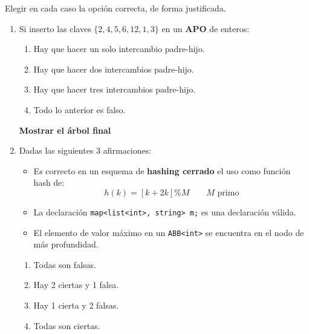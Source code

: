 \documentclass[12pt]{article}
\begin{document}
    \begin{ejercicio}[1 punto] 
        Elegir en cada caso la opción correcta, de forma justificada.
        \begin{enumerate}[label=(\alph*)]
            \item Si inserto las claves $\{2,4,5,6,12,1,3\}$ en un \textbf{APO} de enteros:
                \begin{enumerate}[label=(a\arabic*)]
                    \item Hay que hacer un solo intercambio padre-hijo.
                    \item Hay que hacer dos intercambios padre-hijo.
                    \item Hay que hacer tres intercambios padre-hijo.
                    \item Todo lo anterior es falso.
                \end{enumerate}
                \textbf{Mostrar el árbol final}

            \item Dadas las siguientes 3 afirmaciones:
                \begin{itemize}
                    \item Es correcto en un esquema de \textbf{hashing cerrado} el uso como función hash de:
                        \begin{equation*}
                            h(k) = [k + 2k] \% M \qquad M \text{\ primo}
                        \end{equation*}
                    \item La declaración \verb|map<list<int>, string> m;| es una declaración válida.
                    \item El elemento de valor máximo en un \verb|ABB<int>| se encuentra en el nodo de más profundidad.
                \end{itemize}
                \begin{enumerate}[label=(b\arabic*)]
                    \item Todas son falsas.
                    \item Hay 2 ciertas y 1 falsa.
                    \item Hay 1 cierta y 2 falsas.
                    \item Todas son ciertas.
                \end{enumerate}


\end{enumerate}
\end{ejercicio}
\end{document}
